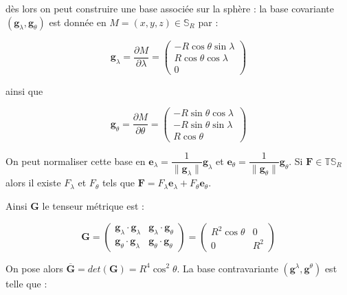 dès lors on peut construire une base associée sur la sphère : la base covariante $( \mathbf{g}_{\lambda}, \mathbf{g}_{\theta})$ est donnée en $M = (x,y,z) \in \mathbb{S}_R$ par :

\begin{equation}
\mathbf{g}_{\lambda} = \dfrac{\partial M}{\partial \lambda} = \begin{pmatrix}
- R \cos \theta \sin \lambda \\ 
R \cos \theta \cos \lambda \\ 
0
\end{pmatrix} 
\end{equation}

ainsi que 

\begin{equation}\label{coord_latlon}
\mathbf{g}_{\theta} = \dfrac{\partial M}{\partial \theta} = \begin{pmatrix}
- R \sin \theta \cos \lambda \\ 
- R \sin \theta \sin \lambda \ \\ 
R \cos \theta
\end{pmatrix} 
\end{equation}

\begin{remarque}
\label{base_lonlat}
On peut normaliser cette base en $\mathbf{e}_{\lambda} = \dfrac{1}{\| \mathbf{g}_{\lambda} \|} \mathbf{g}_{\lambda}$ et $\mathbf{e}_{\theta} = \dfrac{1}{\| \mathbf{g}_{\theta} \|} \mathbf{g}_{\theta}$. Si $\mathbf{F} \in \mathbb{T}\mathbb{S}_R$ alors il existe $F_{\lambda}$ et $F_{\theta}$ tels que $\mathbf{F} = F_{\lambda} \mathbf{e}_{\lambda} + F_{\theta} \mathbf{e}_{\theta}$.
\end{remarque}

Ainsi $\mathbf{G}$ le tenseur métrique est :

\begin{equation}
\mathbf{G} = 
\begin{pmatrix}
\mathbf{g}_{\lambda} \cdot \mathbf{g}_{\lambda} & \mathbf{g}_{\lambda} \cdot \mathbf{g}_{\theta} \\
\mathbf{g}_{\theta} \cdot \mathbf{g}_{\lambda} & \mathbf{g}_{\theta} \cdot \mathbf{g}_{\theta}
\end{pmatrix}
 =
\begin{pmatrix}
R^2 \cos \theta & 0 \\
0 & R^2
\end{pmatrix}
\end{equation}

On pose alors $\overline{\mathbf{G}} = det (\mathbf{G}) = R^4 \cos^2 \theta$. La base contravariante $( \mathbf{g}^{\lambda}, \mathbf{g}^{\theta} ) $ est telle que :

